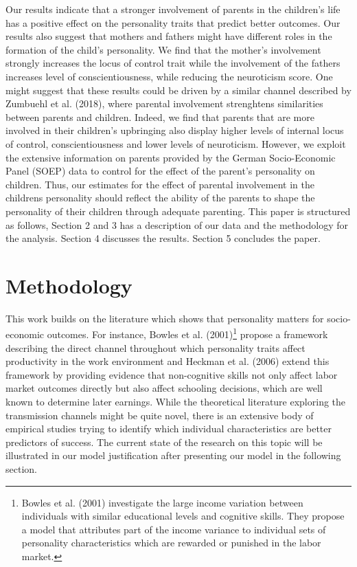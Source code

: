 \documentclass[%
    a4paper,            %
    11pt,               %
    bibliography=totoc, %
]
{scrartcl}
\begin{document}
Our results indicate that a stronger involvement  of parents in the children's life has a positive effect on the personality traits that predict better outcomes. Our results also suggest that mothers and fathers might have different roles in the formation of the child's personality. We find that the mother's involvement strongly increases the locus of control trait while the involvement of the fathers increases level of conscientiousness, while reducing the neuroticism score. One might suggest that these results could be driven by a similar channel described by Zumbuehl et al. (2018), where parental involvement strenghtens similarities between parents and children. Indeed, we find that parents that are more involved in their children's upbringing also display higher levels of internal locus of control, conscientiousness and lower levels of neuroticism.  However, we exploit the extensive information on parents provided by the German Socio-Economic Panel (SOEP) data to control for the effect of the parent’s personality on children. Thus, our estimates for the effect of parental involvement in the childrens personality should reflect the ability of the parents to shape the personality of their children through adequate parenting. 
This paper is structured as follows, Section 2 and 3 has a description of our data and the methodology for the analysis. Section 4 discusses the results. Section 5 concludes the paper.

\section{Methodology}

This work builds on the literature which shows that personality matters for socio-economic outcomes. For instance, Bowles et al. (2001)\footnote{Bowles et al. (2001) investigate the large income variation between individuals with similar educational levels and cognitive skills. They propose a model that attributes part of the income variance to individual sets of personality characteristics which are rewarded or punished in the labor market.}  propose a framework describing the direct channel throughout which personality traits affect productivity in the work environment and Heckman et al. (2006) extend this framework by providing evidence that non-cognitive skills not only affect labor market outcomes directly but also affect schooling decisions, which are well known to determine later earnings. While the theoretical literature exploring the transmission channels might be quite novel, there is an extensive body of empirical studies trying to identify which individual characteristics are better predictors of success. The current state of the research on this topic will be illustrated in our model justification after presenting our model in the following section.
\end{document}
